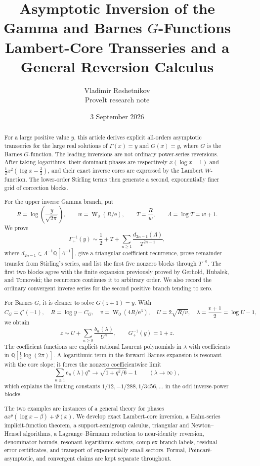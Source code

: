 \documentclass[11pt,oneside]{article}
\theoremstyle{plain}
\theoremstyle{definition}
\theoremstyle{remark}
\newcommand{\W}{\operatorname{W}}
\newcommand{\e}{\mathrm{e}}
\newcommand{\Q}{\mathbb{Q}}
\begin{document}
\title{\textbf{Asymptotic Inversion of the Gamma and Barnes \(G\)-Functions}\\[0.35em]
  \Large Lambert-Core Transseries and a General Reversion Calculus}
\author{Vladimir Reshetnikov\\
  \small ProveIt research note}
\date{3 September 2026}
\maketitle

\begin{abstract}
For a large positive value \(y\), this article derives explicit all-orders
asymptotic transseries for the large real solutions of
\(\Gamma(x)=y\) and \(G(x)=y\), where \(G\) is the Barnes \(G\)-function.
The leading inversions are not ordinary power-series reversions.  After taking
logarithms, their dominant phases are respectively
\(x(\log x-1)\) and \(\tfrac12x^2(\log x-\tfrac32)\), and their exact inverse
cores are expressed by the Lambert \(W\)-function.  The lower-order Stirling
terms then generate a second, exponentially finer grid of correction blocks.

For the upper inverse Gamma branch, put
\[
 R=\log\!\left(\frac{y}{\sqrt{2\pi}}\right),\qquad
 w=\W_0(R/\e),\qquad T=\frac{R}{w},\qquad \Lambda=\log T=w+1.
\]
We prove
\[
 \Gamma_+^{-1}(y)\sim \frac12+T+
 \sum_{n\ge1}\frac{d_{2n-1}(\Lambda)}{T^{2n-1}},
\]
where \(d_{2n-1}\in\Lambda^{-1}\Q[\Lambda^{-1}]\), give a triangular
coefficient recurrence, prove remainder transfer from Stirling's series, and
list the first five nonzero blocks through \(T^{-9}\).  The first two blocks
agree with the finite expansion previously proved by Gerhold, Hubalek, and
Tomovski; the recurrence continues it to arbitrary order.  We also record the
ordinary convergent inverse series for the second positive branch tending to
zero.

For Barnes \(G\), it is cleaner to solve \(G(z+1)=y\).  With
\[
 C_G=\zeta'(-1),\quad R=\log y-C_G,\quad
 v=\W_0(4R/\e^3),\quad U=2\sqrt{R/v},\quad
 \lambda=\frac{v+1}{2}=\log U-1,
\]
we obtain
\[
 z\sim U+\sum_{n\ge0}\frac{b_n(\lambda)}{U^n},
 \qquad G_+^{-1}(y)=1+z.
\]
The coefficient functions are explicit rational Laurent polynomials in
\(\lambda\) with coefficients in \(\Q[\tfrac12\log(2\pi)]\).  A logarithmic
term in the forward Barnes expansion is resonant with the core slope; it
forces the nonzero coefficientwise limit
\[
 \sum_{n\ge1}e_n(\lambda)q^n
 \longrightarrow \sqrt{1+q^2/6}-1
 \qquad(\lambda\to\infty),
\]
which explains the limiting constants \(1/12,-1/288,1/3456,\ldots\) in the
odd inverse-power blocks.

The two examples are instances of a general theory for phases
\(a x^p(\log x-\beta)+\Psi(x)\).  We develop exact Lambert-core inversion,
a Hahn-series implicit-function theorem, a support-semigroup calculus,
triangular and Newton--Hensel algorithms, a Lagrange--B\"urmann reduction to
near-identity reversion, denominator bounds, resonant logarithmic sectors,
complex branch labels, residual error certificates, and transport of
exponentially small sectors.  Formal, Poincar\'e-asymptotic, and convergent
claims are kept separate throughout.
\end{abstract}
\end{document}
